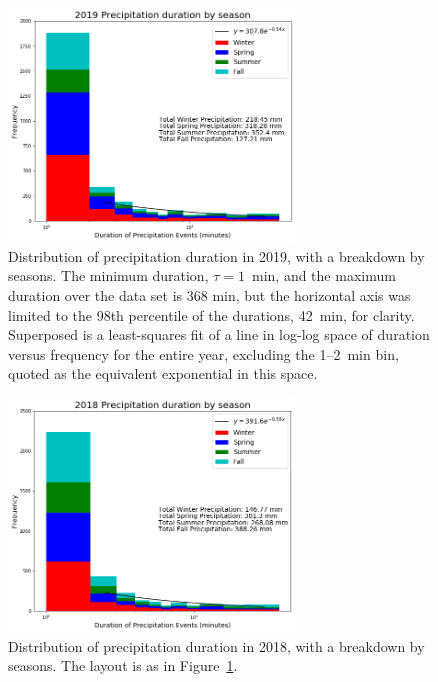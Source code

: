 \documentclass[11pt]{report}
\begin{document}
\begin{figure}[t]
  \centering
  \includegraphics[width=0.675\textwidth]{Figures/More_detail_precip_2019.png}
  \caption[Precipitation histogram for 2019 broken down by season]{\label{p2019}
    Distribution of precipitation duration in 2019, with a breakdown
    by seasons. The minimum duration, $\tau=1$~min, and the maximum
    duration over the data set is 368 min, but the horizontal axis was limited to the 98th percentile of the durations, 42~min, for
    clarity. Superposed is a least-squares fit of a line in log-log
    space of duration versus frequency for the entire year, excluding
    the 1--2~min bin, quoted as the equivalent exponential in this
    space.}
\end{figure}
\begin{figure}[b]
  \centering
  \includegraphics[width=0.675\textwidth]{Figures/precip_2018.png}
  \caption[Precipitation histogram for 2018 broken down by season]{\label{p2018}
    Distribution of precipitation duration in 2018, with a breakdown
    by seasons. The layout is as in Figure~\ref{p2019}.}
\end{figure}
	
\end{document}
